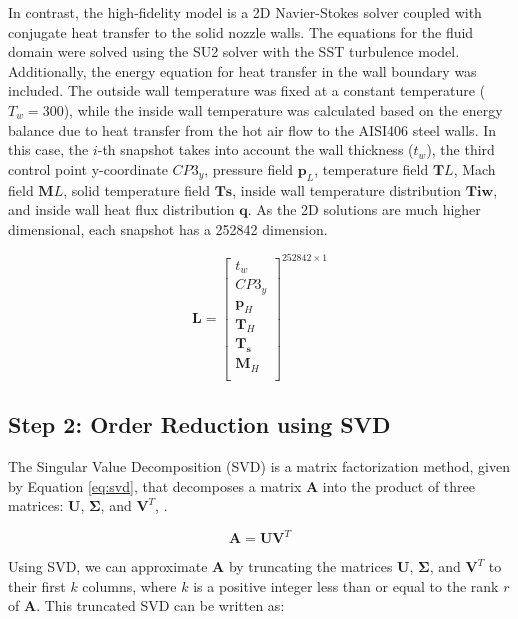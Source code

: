 \documentclass[10pt,oneside,a4paper,twocolumn]{article}
\begin{document}
In contrast, the high-fidelity model is a 2D Navier-Stokes solver coupled with conjugate heat transfer to the solid nozzle walls. The equations for the fluid domain were solved using the SU2 \cite{Economon2016} solver with the SST turbulence model. Additionally, the energy equation for heat transfer in the wall boundary was included. The outside wall temperature was fixed at a constant temperature ($T_w=300$), while the inside wall temperature was calculated based on the energy balance due to heat transfer from the hot air flow to the AISI406 steel walls. In this case, the $i$-th snapshot takes into account the wall thickness ($t_w$), the third control point y-coordinate $CP3_y$, pressure field $\mathbf{p}_L$, temperature field $\mathbf{T}L$, Mach field $\mathbf{M}L$, solid temperature field $\mathbf{T{s}}$, inside wall temperature distribution $\mathbf{T{iw}}$, and inside wall heat flux distribution $\mathbf{q}$. As the 2D solutions are much higher dimensional, each snapshot has a 252842 dimension.

\begin{equation}
\mathbf{L} = \begin{bmatrix}
    t_w \\
    CP3_y \\
    \mathbf{p}_H\\
    \mathbf{T}_H \\
    \mathbf{T_s} \\
    \mathbf{M}_H \\
\end{bmatrix}^{252842 \times 1 }
    \label{eq:H_snapshot_matrix}
\end{equation}

\subsection{Step 2: Order Reduction using SVD}

The Singular Value Decomposition (SVD) is a matrix factorization method, given by Equation \eqref{eq:svd}, that decomposes a matrix $\mathbf{A}$ into the product of three matrices: $\mathbf{U}$, $\mathbf{\Sigma}$, and $\mathbf{V}^T$, \cite{Press2007,Golub2013-ag}.

\begin{equation}
\mathbf{A} = \mathbf{U} \mathbf{V}^T
\label{eq:svd}
\end{equation}

Using SVD, we can approximate $\mathbf{A}$ by truncating the matrices $\mathbf{U}$, $\mathbf{\Sigma}$, and $\mathbf{V}^T$ to their first $k$ columns, where $k$ is a positive integer less than or equal to the rank $r$ of $\mathbf{A}$. This truncated SVD can be written as:
\end{document}
